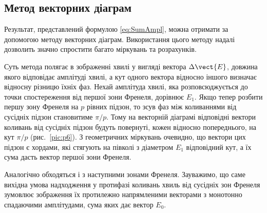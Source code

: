\subsection*{Метод векторних діаграм}


Результат, представлений формулою \eqref{eq:SumAmpl}, можна отримати за допомогою методу векторних діаграм. Використання цього методу надалі дозволить значно спростити багато міркувань та розрахунків.

Суть метода полягає в зображенні хвилі у вигляді вектора $ \Delta\vect{E} $, довжина якого відповідає амплітуді хвилі, а кут одного вектора відносно іншого визначає відносну різницю їхніх фаз. Нехай амплітуда хвилі, яка розповсюджується до точки спостереження від першої зони Френеля, дорівнює $ E_{1} $. Якщо тепер розбити першу зону Френеля на  $ p $  рівних підзон, то зсув фаз між коливаннями від сусідніх підзон становитиме $ \pi/p $. Тому на векторній діаграмі відповідні вектори коливань від сусідніх підзон будуть повернуті, кожен відносно попереднього, на кут $ \pi/p $ (рис.~\ref{pic:p6}). З геометричних міркувань очевидно, що вектори цих підзон є хордами, які стягують на півколі з діаметром $ E_{1} $ відповідний кут, а їх сума дасть вектор першої зони Френеля.


Аналогічно обходяться і з наступними зонами Френеля. Зауважимо, що саме вихідна умова надходження у протифазі коливань хвиль від сусідніх зон Френеля зумовлює зображення їх протилежно напрямленими векторами з монотонно спадаючими амплітудами, сума яких дає вектор $ E_0 $.

